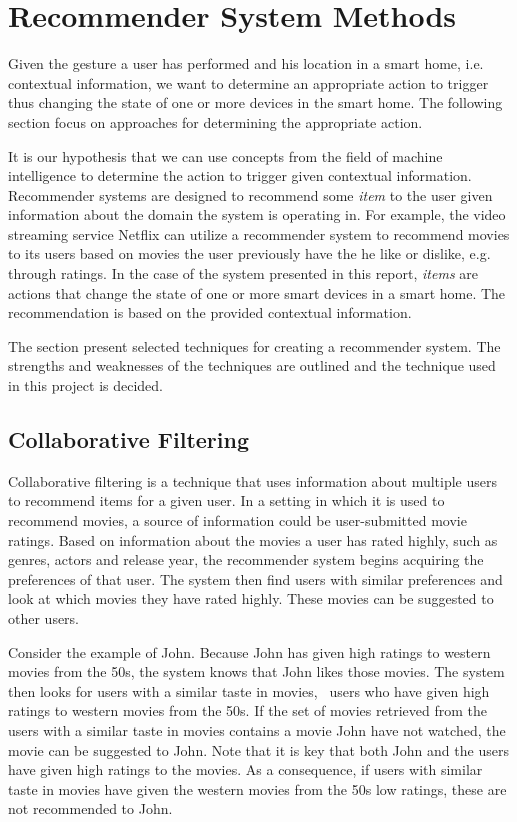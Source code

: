 \section{Recommender System Methods}
\label{sec:analysis:recommender-systems}

Given the gesture a user has performed and his location in a smart home, i.e. contextual information, we want to determine an appropriate action to trigger thus changing the state of one or more devices in the smart home. The following section focus on approaches for determining the appropriate action.

It is our hypothesis that we can use concepts from the field of machine intelligence to determine the action to trigger given contextual information. Recommender systems are designed to recommend some \emph{item} to the user given information about the domain the system is operating in. For example, the video streaming service Netflix can utilize a recommender system to recommend movies to its users based on movies the user previously have the he like or dislike, e.g. through ratings.
In the case of the system presented in this report, \emph{items} are actions that change the state of one or more smart devices in a smart home. The recommendation is based on the provided contextual information.

The section present selected techniques for creating a recommender system. The strengths and weaknesses of the techniques are outlined and the technique used in this project is decided.

\subsection{Collaborative Filtering}
\label{sec:analysis:recommender-methods:collaborative-filtering}

Collaborative filtering is a technique that uses information about multiple users to recommend items for a given user.
In a setting in which it is used to recommend movies, a source of information could be user-submitted movie ratings.
Based on information about the movies a user has rated highly, such as genres, actors and release year, the recommender system begins acquiring the preferences of that user.
The system then find users with similar preferences and look at which movies they have rated highly. These movies can be suggested to other users.

Consider the example of John. Because John has given high ratings to western movies from the 50s, the system knows that John likes those movies. The system then looks for users with a similar taste in movies, \ie~users who have given high ratings to western movies from the 50s. If the set of movies retrieved from the users with a similar taste in movies contains a movie John have not watched, the movie can be suggested to John. Note that it is key that both John and the users have given high ratings to the movies. As a consequence, if users with similar taste in movies have given the western movies from the 50s low ratings, these are not recommended to John.

